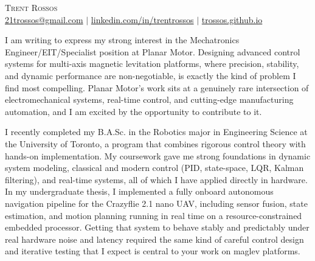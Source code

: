 \documentclass[12pt]{letter}
\begin{document}
\AddToShipoutPictureBG{%
\color{gr}
\AtPageUpperLeft{\rule[-1.3in]{\paperwidth}{1.3in}}
}

\begin{center}
  {\fontsize{28}{0}\selectfont\scshape Trent Rossos}\\[4pt]
  \href{mailto:21trossos@gmail.com}{21trossos@gmail.com} $|$
  \href{https://linkedin.com/in/trentrossos}{linkedin.com/in/trentrossos} $|$
  \href{https://trossos.github.io}{{trossos.github.io}}
\end{center}

\vspace{0.3in}



\vspace{-0.1in}
\setlength\parindent{12pt} %
 
\noindent
 I am writing to express my strong interest in the Mechatronics Engineer/EIT/Specialist position at Planar Motor. Designing advanced control systems for multi-axis magnetic levitation platforms, where precision, stability, and dynamic performance are non-negotiable, is exactly the kind of problem I find most compelling. Planar Motor's work sits at a genuinely rare intersection of electromechanical systems, real-time control, and cutting-edge manufacturing automation, and I am excited by the opportunity to contribute to it.
 
I recently completed my B.A.Sc. in the Robotics major in Engineering Science at the University of Toronto, a program that combines rigorous control theory with hands-on implementation. My coursework gave me strong foundations in dynamic system modeling, classical and modern control (PID, state-space, LQR, Kalman filtering), and real-time systems, all of which I have applied directly in hardware. In my undergraduate thesis, I implemented a fully onboard autonomous navigation pipeline for the Crazyflie 2.1 nano UAV, including sensor fusion, state estimation, and motion planning running in real time on a resource-constrained embedded processor. Getting that system to behave stably and predictably under real hardware noise and latency required the same kind of careful control design and iterative testing that I expect is central to your work on maglev platforms.
 
\end{document}
